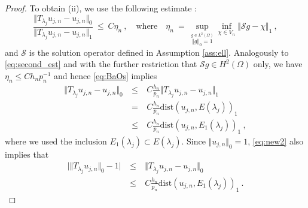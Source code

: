 \documentclass[preprint ,12pt]{elsarticle}
\newcommand{\cS}{\mathcal{S}}
\begin{document}
\begin{proof}
To obtain  (ii),  we use the following estimate 
\cite[(3.31a)]{BaOs:89}:
\begin{equation}\label{eq:BaOs}\frac{\Vert T_{\lambda_j}u_{j, n} - u_{j, n}
  \Vert_{0}}{\Vert T_{\lambda_j}u_{j, n} - u_{j, n}
  \Vert_{1}} \ \leq \ C \eta_n\ , \quad 
\text{where} \quad \eta_n \ = \ \sup_{\stackrel{g \in L^2(\Omega)}{\Vert
    g\Vert_{0} = 1 }} \inf_{\chi \in V_n} \Vert \cS g - \chi
\Vert_{1} \ , \end{equation} and $\cS $ is the solution
operator defined in
Assumption \ref{ass:ell}. Analogously to \eqref{eq:second_est} and with the further restriction that $\cS g\in H^2(\Omega)$ only, we have
$\eta_n \leq C h_n p_n^{-1}$ and hence \eqref{eq:BaOs} implies
 \begin{eqnarray}
\Vert T_{\lambda_j}u_{j, n} - u_{j, n}
  \Vert_0 \ & \leq  & \  C     \frac{h_n}{p_n} \Vert T_{\lambda_j}u_{j, n} - u_{j, n}
  \Vert_1  \nonumber \\
& =  & \ C \frac{h_n}{p_n} \mathrm{dist} (u_{j,n}
,E(\lambda_j))_1  \nonumber  \\ 
& \leq & \  C   \frac{h_n}{p_n} \mathrm{dist} (u_{j,n}
,E_1(\lambda_j))_1 \ ,  \label{eq:new2}
 \end{eqnarray} 
where we used the inclusion $E_1(\lambda_j) \subset E(\lambda_j)$. 
Since $\Vert u_{j,n}\Vert_0 = 1$,  \eqref{eq:new2} also implies
that 
 \begin{eqnarray}
\bigg\vert \Vert T_{\lambda_j}u_{j, n} \Vert_0  -1 \bigg\vert \
& \leq  & \  \Vert T_{\lambda_j}u_{j, n} - u_{j, n}
  \Vert_0  \nonumber  \\
& \leq & \  C   \frac{h_n}{p_n} \mathrm{dist} (u_{j,n}
,E_1(\lambda_j))_1 \ . \label{eq:new4}
 \end{eqnarray} 

\end{proof}
\end{document}
